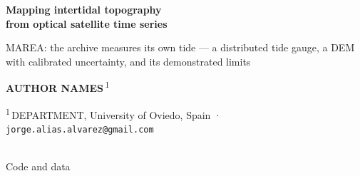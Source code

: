 %
\vspace*{-14mm}%
\begin{minipage}[c]{0.145\textwidth}
  \color{white}
  \setlength{\fboxrule}{1pt}%
  \textcolor{white}{}
\end{minipage}\hfill
\begin{minipage}[c]{0.70\textwidth}
  \color{white}\raggedright
  {\fontsize{78}{88}\selectfont\bfseries Mapping intertidal topography\\ from optical satellite time series\par}
  \vspace{7mm}
  {\fontsize{34}{42}\selectfont MAREA: the archive measures its own tide --- a distributed tide
   gauge, a DEM with calibrated uncertainty, and its demonstrated limits\par}
  \vspace{9mm}
  {\fontsize{30}{38}\selectfont
   \textbf{AUTHOR NAMES}\,\textsuperscript{1}\par}
  \vspace{2mm}
  {\fontsize{25}{32}\selectfont\color{PMist}
   \textsuperscript{1}\,DEPARTMENT, University of Oviedo, Spain \quad·\quad
   \texttt{jorge.alias.alvarez@gmail.com}\par}
\end{minipage}\hfill
\begin{minipage}[c]{0.115\textwidth}
  \centering\color{white}
  \colorbox{white}{}\\[3mm]
  {\small Code and data}
\end{minipage}
\par\vspace{20mm}
